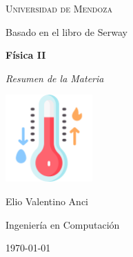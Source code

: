 \documentclass[a4paper,12pt]{article}  %
\begin{document}
\begin{titlepage}
  \centering
  \vspace*{2cm} %

  {\scshape\LARGE Universidad de Mendoza\par}
  \vspace{2cm}
  {\large Basado en el libro de Serway\par}
  \vspace{1.5cm}

  {\Huge\bfseries Física II\par}
  \vspace{0.5cm}
  {\Large\itshape Resumen de la Materia\par} %

  \vspace{1.5cm}
  \includegraphics[width=0.25\textwidth]{images/cover.png} %
  \vspace{1.5cm}

  {\Large Elio Valentino Anci\par}
  {\large Ingeniería en Computación\par}

  \vfill

  {\large \today\par}
\end{titlepage}

\newpage

\tableofcontents  %

\newpage


\newpage

\newpage

\newpage

\newpage

\newpage

\newpage

\newpage

\end{document}

